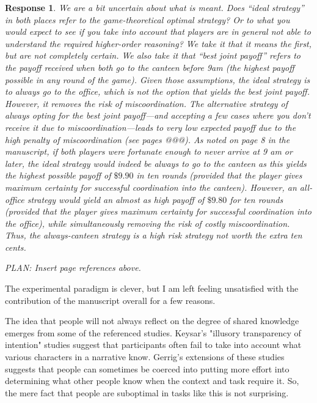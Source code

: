 \documentclass[a4paper]{article}
\newtheorem{response}{Response}
\begin{document}
\begin{response} 
We are a bit uncertain about what is meant. Does ``ideal strategy'' in both places refer to the game-theoretical optimal strategy? Or to what you would expect to see if you take into account that players are in general not able to understand the required higher-order reasoning? We take it that it means the first, but are not completely certain. We also take it that ``best joint payoff'' refers to the payoff received when both go to the canteen before 9am (the highest payoff possible in any round of the game). Given those assumptions, the ideal strategy is to always go to the office, which is \emph{not} the option that yields the best joint payoff.  However, it removes the risk of miscoordination. The alternative strategy of always opting for the best joint payoff---and accepting a few cases where you don't receive it due to miscoordination---leads to very low expected payoff due to the high penalty of miscoordination (see pages @@@). As noted on page 8 in the manuscript, if both players were fortunate enough to never arrive at 9 am or later, the ideal strategy would indeed be always to go to the canteen as this yields the highest possible payoff of $\$9.90$ in ten rounds (provided that the player gives maximum certainty for successful coordination into the canteen). However, an all-office strategy would yield an almost as high payoff of $\$9.80$ for ten rounds (provided that the player gives maximum certainty for successful coordination into the office), while simultaneously removing the risk of costly miscoordination. Thus, the always-canteen strategy is a high risk strategy not worth the extra ten cents.

PLAN: Insert page references above. 
\end{response}

The experimental paradigm is clever, but I am left feeling unsatisfied with the contribution of the manuscript overall for a few reasons.

The idea that people will not always reflect on the degree of shared knowledge emerges from some of the referenced studies. Keysar's "illusory transparency of intention" studies suggest that participants often fail to take into account what various characters in a narrative know. Gerrig's extensions of these studies suggests that people can sometimes be coerced into putting more effort into determining what other people know when the context and task require it. So, the mere fact that people are suboptimal in tasks like this is not surprising.
\end{document}
